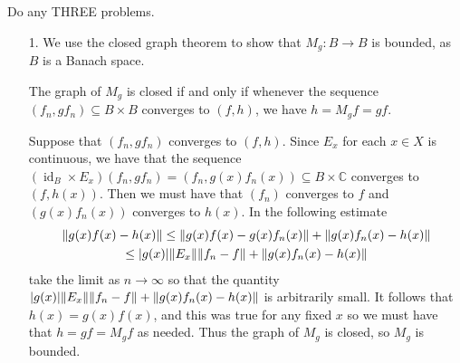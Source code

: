\documentclass[11pt]{article}
\DeclareMathOperator{\id}{id}
\begin{document}
Do any THREE problems.
\begin{enumerate}
    \item[1.] We use the closed graph theorem to show that $M_g\colon B\to B$ is bounded, as $B$ is a Banach space.
    
    The graph of $M_g$ is closed if and only if whenever the sequence $(f_n,gf_n)\subseteq B\times B$ converges to $(f,h)$, we have $h = M_g f = gf$. 
    
    Suppose that $(f_n,gf_n)$ converges to $(f,h)$. Since $E_x$ for each $x\in X$ is continuous, we have that the sequence $(\id_B\times E_x)(f_n,gf_n) = (f_n,g(x)f_n(x))\subseteq B\times \mathbb{C}$ converges to $(f,h(x))$. Then we must have that $(f_n)$ converges to $f$ and $(g(x)f_n(x))$ converges to $h(x)$. In the following estimate \begin{multline*}
      \norm{g(x)f(x)-h(x)} \leq \norm{g(x)f(x)-g(x)f_n(x)} + \norm{g(x)f_n(x)-h(x)}\\\leq \abs{g(x)}\norm{E_x}\norm{f_n-f}+\norm{g(x)f_n(x)-h(x)}
    \end{multline*} take the limit as $n\to \infty$ so that the quantity $\abs{g(x)}\norm{E_x}\norm{f_n-f}+\norm{g(x)f_n(x)-h(x)}$ is arbitrarily small. It follows that $h(x) = g(x)f(x)$, and this was true for any fixed $x$ so we must have that $h = gf =M_gf$ as needed. Thus the graph of $M_g$ is closed, so $M_g$ is bounded.
\end{enumerate}
\end{document}
